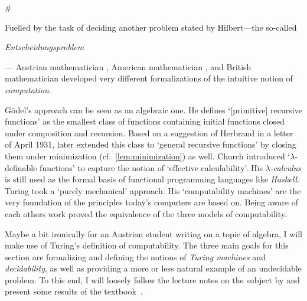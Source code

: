 #

Fuelled by the task of deciding another problem stated by Hilbert---the
so-called \begin{german}\emph{Entscheidungsproblem}\end{german}--- Austrian
mathematician \textcite{Goedel1931}, American mathematician
\textcite{Church1936a,Church1936}, and British mathematician
\textcite{Turing1936} developed very different formalizations of the intuitive
notion of \emph{computation}.

Gödel's approach can be seen as an algebraic one. He defines ‘[primitive]
recursive functions’ as the smallest class of functions containing initial
functions closed under composition and recursion. Based on a suggestion of
Herbrand in a letter of April 1931, \textcite{Goedel1934} later extended this
class to ‘general recursive functions’ by closing them under minimization
(cf.~\cref{lem:minimization}) as well. Church introduced ‘\(λ\)-definable
functions’ to capture the notion of ‘effective calculability’. His
\emph{\(λ\)-calculus} is still used as the formal basis of functional
programming languages like \emph{Haskell}. Turing took a ‘purely mechanical’
approach. His ‘computability machines’ are the very foundation of the principles
today's computers are based on. Being aware of each others work
\textcite{Church1936,Kleene1936,Turing1936} proved the equivalence of the three
models of computability.

Maybe a bit ironically for an Austrian student writing on a topic of algebra, I
will make use of Turing's definition of computability. The three main goals for
this section are formalizing and defining the notions of \emph{Turing machines}
and \emph{decidability}, as well as providing a more or less natural example of
an undecidable problem. To this end, I will loosely follow the lecture notes on
the subject by \textcite{Mueller2016} and present some results of the
textbook~\cite{Cooper2004}.

